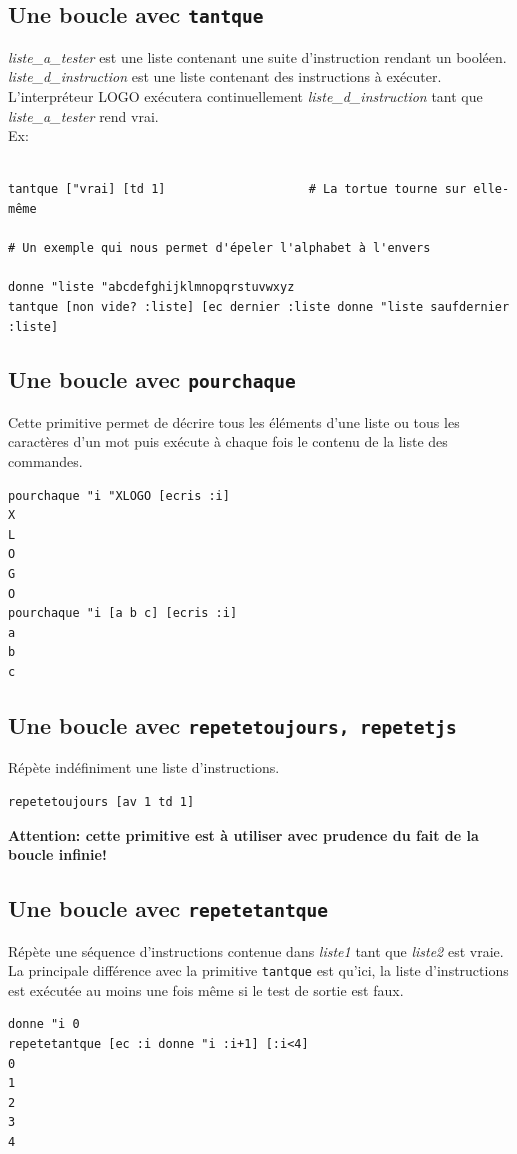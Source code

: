 \subsection{Une boucle avec \texttt{tantque}}
\noindent {}
\textit{liste\_a\_tester} est une liste contenant une suite d'instruction rendant un booléen. \textit{liste\_d\_instruction} est une liste contenant des instructions à exécuter. L'interpréteur LOGO exécutera continuellement \textit{liste\_d\_instruction} tant que \textit{liste\_a\_tester} rend vrai.\\
Ex:
\begin{verbatim}

tantque ["vrai] [td 1]                    # La tortue tourne sur elle-même

# Un exemple qui nous permet d'épeler l'alphabet à l'envers

donne "liste "abcdefghijklmnopqrstuvwxyz
tantque [non vide? :liste] [ec dernier :liste donne "liste saufdernier :liste]
\end{verbatim}
\subsection{Une boucle avec \texttt{pourchaque}}
\noindent {} 
Cette primitive permet de décrire tous les éléments d'une liste ou tous les caractères d'un mot puis exécute à chaque fois le contenu de la liste des commandes.
\begin{verbatim}
pourchaque "i "XLOGO [ecris :i]
X
L
O
G
O
pourchaque "i [a b c] [ecris :i]
a
b
c
\end{verbatim}
\subsection{Une boucle avec \texttt{repetetoujours, repetetjs}}
\noindent {}
Répète indéfiniment une liste d'instructions.
\begin{verbatim}
repetetoujours [av 1 td 1]
\end{verbatim}
\textbf{Attention: cette primitive est à utiliser avec prudence du fait de la boucle infinie!}
\subsection{Une boucle avec \texttt{repetetantque}}
\noindent {}
Répète une séquence d'instructions contenue dans \textit{liste1} tant que \textit{liste2} est vraie.\\
La principale différence avec la primitive \texttt{tantque} est qu'ici, la liste d'instructions est exécutée au moins une fois même si le test de sortie est faux.
\begin{verbatim}
donne "i 0
repetetantque [ec :i donne "i :i+1] [:i<4]
0
1
2
3
4
\end{verbatim}
